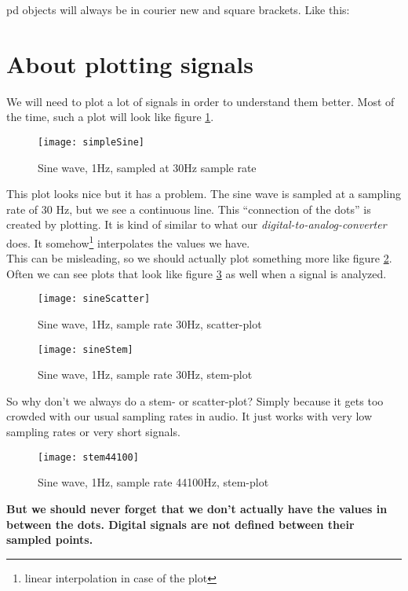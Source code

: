 
pd objects will always be in courier new and square brackets. Like this: 



\section{About plotting signals}

We will need to plot a lot of signals in order to understand them better. Most of the time, such a plot will look like figure \ref{fig:simpeSine}.

\begin{figure}[h!]
	\centering
	\texttt{[image: simpleSine]}
	\caption[simple sine plot]
	{Sine wave, 1Hz, sampled at 30Hz sample rate}
	\label{fig:simpeSine}
\end{figure}

This plot looks nice but it has a problem. The sine wave is sampled at a sampling rate of 30 Hz, but we see a continuous line. This ``connection of the dots'' is created by plotting. It is kind of similar to what our \textit{digital-to-analog-converter} does. It somehow\footnote{linear interpolation in case of the plot} interpolates the values we have. \\
This can be misleading, so we should actually plot something more like figure \ref{fig:scatter}. Often we can see plots that look like figure \ref{fig:stem} as well when a signal is analyzed.

\begin{figure}[H]
	\centering
	\texttt{[image: sineScatter]}
	\caption[shortCaption]
	{Sine wave, 1Hz, sample rate 30Hz, scatter-plot}
	\label{fig:scatter}
\end{figure}



\begin{figure}[H]
	\centering
	\texttt{[image: sineStem]}
	\caption[shortCaption]
	{Sine wave, 1Hz, sample rate 30Hz, stem-plot}
	\label{fig:stem}
\end{figure}


So why don't we always do a stem- or scatter-plot? Simply because it gets too crowded with our usual sampling rates in audio. It just works with very low sampling rates or very short signals.\\
\begin{figure}[H]
	\centering
	\texttt{[image: stem44100]}
	\caption[shortCaption]
	{Sine wave, 1Hz, sample rate 44100Hz, stem-plot}
	\label{fig:label}
\end{figure}
\textbf{But we should never forget that we don't actually have the values in between the dots. Digital signals are not defined between their sampled points.}

